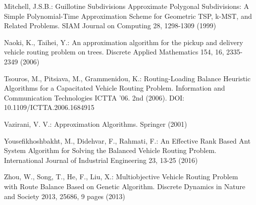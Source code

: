 \begin{thebibliography}{}
 Mitchell, J.S.B.: Guillotine Subdivisions Approximate Polygonal Subdivisions: A Simple Polynomial-Time Approximation Scheme for Geometric TSP, k-MST, and Related Problems. SIAM Journal on Computing 28, 1298-1309 (1999) 

 Naoki, K., Taihei, Y.: An approximation algorithm for the pickup and delivery vehicle routing problem on trees. Discrete Applied Mathematics 154, 16, 2335-2349 (2006)

 Tsouros, M., Pitsiava, M., Grammenidou, K.: Routing-Loading Balance Heuristic Algorithms for a Capacitated Vehicle Routing Problem. Information and Communication Technologies  ICTTA '06. 2nd (2006). DOI: 10.1109/ICTTA.2006.1684915 

 Vazirani, V. V.: Approximation Algorithms. Springer (2001) 

   Yousefikhoshbakht, M., Didehvar, F., Rahmati, F.: An Effective Rank Based Ant System Algorithm for Solving the Balanced Vehicle Routing Problem. International Journal of Industrial Engineering 23, 13-25 (2016) 

  Zhou, W., Song, T., He, F., Liu, X.: Multiobjective Vehicle Routing Problem with Route Balance Based on Genetic Algorithm. Discrete Dynamics in Nature and Society 2013, 25686, 9 pages (2013) 

\end{thebibliography}










